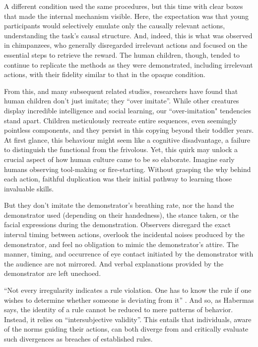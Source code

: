 A different condition used the same procedures, but this time with clear boxes that made the internal mechanism visible. Here, the expectation was that young participants would selectively emulate only the causally relevant actions, understanding the task's causal structure. And, indeed, this is what was observed in chimpanzees, who generally disregarded irrelevant actions and focused on the essential steps to retrieve the reward. The human children, though, tended to continue to replicate the methods as they were demonstrated, including irrelevant actions, with their fidelity similar to that in the opaque condition.

From this, and many subsequent related studies, researchers have found that human children don't just imitate; they ``over imitate''. While other creatures display incredible intelligence and social learning, our ``over-imitation" tendencies stand apart.  Children meticulously recreate entire sequences, even seemingly pointless components, and they persist in this copying beyond their toddler years. At first glance, this behaviour might seem like a cognitive disadvantage, a failure to distinguish the functional from the frivolous. Yet, this quirk may unlock a crucial  aspect of how human culture came to be so elaborate. Imagine  early humans observing tool-making or fire-starting. Without grasping the why behind each action, faithful duplication was their initial pathway to learning those invaluable skills.

But they don't imitate the demonstrator's breathing rate, nor the hand the demonstrator used (depending on their handedness), the stance taken, or the facial expressions during the demonstration. Observers disregard the exact interval timing between actions, overlook the incidental noises produced by the demonstrator, and feel no obligation to mimic the demonstrator's attire. The manner, timing, and occurrence of eye contact initiated by the demonstrator with the audience are not mirrored. And verbal explanations provided by the demonstrator are left unechoed.

``Not every irregularity indicates a rule violation. One has to know the rule if one wishes to determine whether someone is deviating from it'' \citep[17]{Habermas1987}. And so, as Habermas says, the identity of a rule cannot be reduced to mere patterns of behavior. Instead, it relies on ``intersubjective validity''. This entails that individuals, aware of the norms guiding their actions, can both diverge from and critically evaluate such divergences as breaches of established rules.

